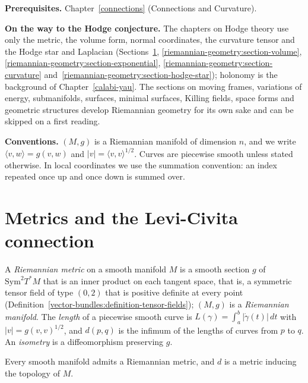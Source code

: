 \noindent\textbf{Prerequisites.} Chapter~\ref{connections} (Connections and Curvature).

\noindent\textbf{On the way to the Hodge conjecture.} The chapters on Hodge theory use only the metric, the volume form, normal coordinates, the curvature tensor and the Hodge star and
Laplacian (Sections~\ref{riemannian-geometry:section-levi-civita}, \ref{riemannian-geometry:section-volume}, \ref{riemannian-geometry:section-exponential}, \ref{riemannian-geometry:section-curvature} and~\ref{riemannian-geometry:section-hodge-star}); holonomy is the background of Chapter~\ref{calabi-yau}. The sections on moving frames,
variations of energy, submanifolds, surfaces, minimal surfaces, Killing fields, space forms and geometric structures develop Riemannian geometry for its own sake and can be skipped on a first
reading.

\noindent\textbf{Conventions.} $(M, g)$ is a Riemannian manifold of dimension $n$, and we write $\langle v, w\rangle = g(v, w)$ and $|v| = \langle v, v\rangle^{1/2}$. Curves are piecewise smooth unless stated otherwise. In local
coordinates we use the summation convention: an index repeated once up and once down is summed over.

\section{Metrics and the Levi-Civita connection}\label{riemannian-geometry:section-levi-civita}

\begin{definition}\label{riemannian-geometry:definition-metric}
A \emph{Riemannian metric} on a smooth manifold $M$ is a smooth section $g$ of $\mathrm{Sym}^2T^*M$ that is an inner product on each tangent space, that is, a symmetric tensor field
of type $(0,2)$ that is positive definite at every point (Definition~\ref{vector-bundles:definition-tensor-fields}); $(M, g)$ is a \emph{Riemannian manifold}. The
\emph{length} of a piecewise smooth curve is $L(\gamma) = \int_a^b|\dot\gamma(t)|\,dt$ with $|v| = g(v, v)^{1/2}$, and $d(p, q)$ is the infimum of the lengths of curves from $p$ to $q$. An \emph{isometry} is a
diffeomorphism preserving $g$.
\end{definition}

\begin{proposition}\label{riemannian-geometry:proposition-metric-exists}
Every smooth manifold admits a Riemannian metric, and $d$ is a metric inducing the topology of $M$.
\end{proposition}

